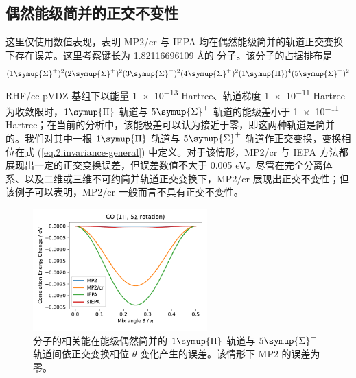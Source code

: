 \subsection{偶然能级简并的正交不变性}

这里仅使用数值表现，表明 MP2/cr 与 IEPA 均在偶然能级简并的轨道正交变换下存在误差。这里考察键长为 1.82116696109 \AA 的  分子。该分子的占据排布是
$$
(1 \symup{\Sigma}^+)^2 (2 \symup{\Sigma}^+)^2 (3 \symup{\Sigma}^+)^2 (4 \symup{\Sigma}^+)^2 (1 \symup{\Pi})^4 (5 \symup{\Sigma}^+)^2
$$
RHF/cc-pVDZ 基组下以能量 \num{1e-13} Hartree、轨道梯度 \num{1e-11} Hartree 为收敛限时，$1 \symup{\Pi}$ 轨道与 $5 \symup{\Sigma}^+$ 轨道的能级差小于 \num{1e-11} Hartree；在当前的分析中，该能极差可以认为接近于零，即这两种轨道是简并的。我们对其中一根 $1 \symup{\Pi}$ 轨道与 $5 \symup{\Sigma}^+$ 轨道作正交变换，变换相位在式 (\ref{eq.2.invariance-general}) 中定义。对于该情形，MP2/cr 与 IEPA 方法都展现出一定的正交变换误差，但误差数值不大于 0.005 eV。尽管在完全分离体系、以及二维或三维不可约简并轨道正交变换下，MP2/cr 展现出正交不变性；但该例子可以表明，MP2/cr 一般而言不具有正交不变性。

\begin{figure}[!ht]
  \centering
  \includegraphics[width=0.6\textwidth]{assets/invar-sep-CO.pdf}
  \caption[ 偶然简并轨道正交变换误差]{ 分子的相关能在能级偶然简并的 $1 \symup{\Pi}$ 轨道与 $5 \symup{\Sigma}^+$ 轨道间依正交变换相位 $\theta$ 变化产生的误差。该情形下 MP2 的误差为零。}
  \label{fig.2.invar-sep-CO}
\end{figure}
